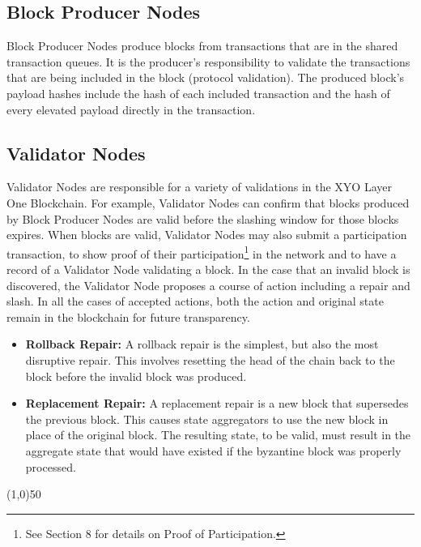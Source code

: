 \documentclass{article}
\begin{document}
\subsection{Block Producer Nodes}
Block Producer Nodes produce blocks from transactions that are in the shared transaction queues. It is the producer's responsibility to validate the transactions that are being included in the block (protocol validation). The produced block's payload hashes include the hash of each included transaction and the hash of every elevated payload directly in the transaction. 

\subsection{Validator Nodes}
Validator Nodes are responsible for a variety of validations in the XYO Layer One Blockchain. For example, Validator Nodes can confirm that blocks produced by Block Producer Nodes are valid before the slashing window for those blocks expires. When blocks are valid, Validator Nodes may also submit a participation transaction, to show proof of their participation\footnote{See Section 8 for details on Proof of Participation.} in the network and to have a record of a Validator Node validating a block. In the case that an invalid block is discovered, the Validator Node proposes a course of action including a repair and slash. In all the cases of accepted actions, both the action and original state remain in the blockchain for future transparency. 

\begin{itemize}
    \item \textbf{Rollback Repair:} A rollback repair is the simplest, but also the most disruptive repair. This involves resetting the head of the chain back to the block before the invalid block was produced.
    \item \textbf{Replacement Repair:} A replacement repair is a new block that supersedes the previous block. This causes state aggregators to use the new block in place of the original block. The resulting state, to be valid, must result in the aggregate state that would have existed if the byzantine block was properly processed.
\end{itemize}

\begin{center}
    \line(1,0){50}
\end{center}
\end{document}
